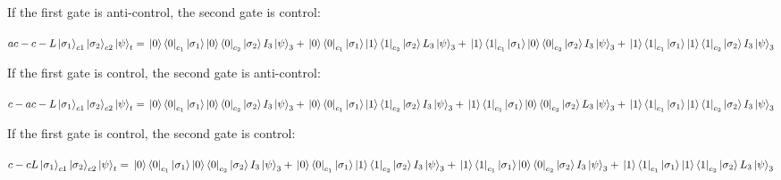 \documentclass[12pt]{article}
\begin{document}
\begin{enumerate}
          If the first gate is anti-control, the second gate is control:

          $
              ac-c-L\ket{\sigma_1}_{c1}\ket{\sigma_2}_{c2}\ket{\psi}_t=
              \\\ket{0}\bra{0}_{c_1}\ket{\sigma_1}\ket{0}\bra{0}_{c_2}\ket{\sigma_2}I_3\ket{\psi}_3+
              \\\ket{0}\bra{0}_{c_1}\ket{\sigma_1}\ket{1}\bra{1}_{c_2}\ket{\sigma_2}L_3\ket{\psi}_3+
              \\\ket{1}\bra{1}_{c_1}\ket{\sigma_1}\ket{0}\bra{0}_{c_2}\ket{\sigma_2}I_3\ket{\psi}_3+
              \\\ket{1}\bra{1}_{c_1}\ket{\sigma_1}\ket{1}\bra{1}_{c_2}\ket{\sigma_2}I_3\ket{\psi}_3
          $

          If the first gate is control, the second gate is anti-control:

          $
              c-ac-L\ket{\sigma_1}_{c1}\ket{\sigma_2}_{c2}\ket{\psi}_t=
              \\\ket{0}\bra{0}_{c_1}\ket{\sigma_1}\ket{0}\bra{0}_{c_2}\ket{\sigma_2}I_3\ket{\psi}_3+
              \\\ket{0}\bra{0}_{c_1}\ket{\sigma_1}\ket{1}\bra{1}_{c_2}\ket{\sigma_2}I_3\ket{\psi}_3+
              \\\ket{1}\bra{1}_{c_1}\ket{\sigma_1}\ket{0}\bra{0}_{c_2}\ket{\sigma_2}L_3\ket{\psi}_3+
              \\\ket{1}\bra{1}_{c_1}\ket{\sigma_1}\ket{1}\bra{1}_{c_2}\ket{\sigma_2}I_3\ket{\psi}_3
          $


          If the first gate is control, the second gate is control:

          $
              c-cL\ket{\sigma_1}_{c1}\ket{\sigma_2}_{c2}\ket{\psi}_t=
              \\\ket{0}\bra{0}_{c_1}\ket{\sigma_1}\ket{0}\bra{0}_{c_2}\ket{\sigma_2}I_3\ket{\psi}_3+
              \\\ket{0}\bra{0}_{c_1}\ket{\sigma_1}\ket{1}\bra{1}_{c_2}\ket{\sigma_2}I_3\ket{\psi}_3+
              \\\ket{1}\bra{1}_{c_1}\ket{\sigma_1}\ket{0}\bra{0}_{c_2}\ket{\sigma_2}I_3\ket{\psi}_3+
              \\\ket{1}\bra{1}_{c_1}\ket{\sigma_1}\ket{1}\bra{1}_{c_2}\ket{\sigma_2}L_3\ket{\psi}_3
          $


\end{enumerate}
\end{document}
